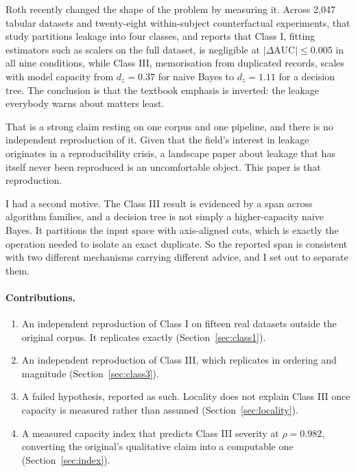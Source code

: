 \documentclass[10pt,twocolumn]{article}
\begin{document}
Roth \cite{roth2026} recently changed the shape of the problem by measuring it.
Across 2{,}047 tabular datasets and twenty-eight within-subject counterfactual
experiments, that study partitions leakage into four classes, and reports that
Class I, fitting estimators such as scalers on the full dataset, is negligible at
$|\Delta\mathrm{AUC}| \leq 0.005$ in all nine conditions, while Class III,
memorisation from duplicated records, scales with model capacity from
$d_z = 0.37$ for naive Bayes to $d_z = 1.11$ for a decision tree. The conclusion
is that the textbook emphasis is inverted: the leakage everybody warns about
matters least.

That is a strong claim resting on one corpus and one pipeline, and there is no
independent reproduction of it. Given that the field's interest in leakage
originates in a reproducibility crisis, a landscape paper about leakage that has
itself never been reproduced is an uncomfortable object. This paper is that
reproduction.

I had a second motive. The Class III result is evidenced by a span across
algorithm families, and a decision tree is not simply a higher-capacity naive
Bayes. It partitions the input space with axis-aligned cuts, which is exactly the
operation needed to isolate an exact duplicate. So the reported span is
consistent with two different mechanisms carrying different advice, and I set out
to separate them.

\paragraph{Contributions.}
\begin{enumerate}\itemsep0pt
\item An independent reproduction of Class I on fifteen real datasets outside the
original corpus. It replicates exactly (Section~\ref{sec:class1}).
\item An independent reproduction of Class III, which replicates in ordering and
magnitude (Section~\ref{sec:class3}).
\item A failed hypothesis, reported as such. Locality does not explain Class III
once capacity is measured rather than assumed (Section~\ref{sec:locality}).
\item A measured capacity index that predicts Class III severity at
$\rho = 0.982$, converting the original's qualitative claim into a computable
one (Section~\ref{sec:index}).
\end{enumerate}
\end{document}

